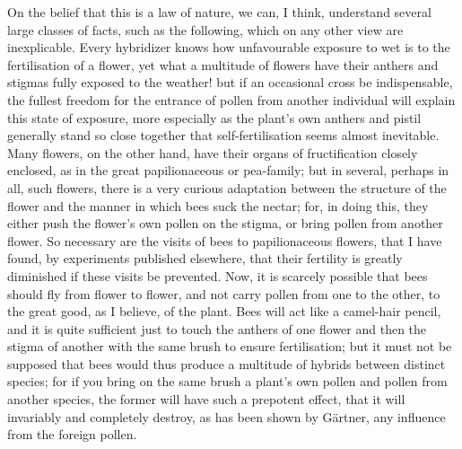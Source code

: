 \indent On the belief that this is a law of nature, we can, I think, understand several large classes of facts, such as the following, which on any other view are inexplicable.  Every hybridizer knows how unfavourable exposure to wet is to the fertilisation of a flower, yet what a multitude of flowers have their anthers and stigmas fully exposed to the weather! but if an occasional cross be indispensable, the fullest freedom for the entrance of pollen from another individual will explain this state of exposure, more especially as the plant's own anthers and pistil generally stand so close together that self-fertilisation seems almost inevitable. Many flowers, on the other hand, have their organs of fructification closely enclosed, as in the great papilionaceous or pea-family; but in several, perhaps in all, such flowers, there is a very curious adaptation between the structure of the flower and the manner in which bees suck the nectar; for, in doing this, they either push the flower's own pollen on the stigma, or bring pollen from another flower. So necessary are the visits of bees to papilionaceous flowers, that I have found, by experiments published elsewhere, that their fertility is greatly diminished if these visits be prevented. Now, it is scarcely possible that bees should fly from flower to flower, and not carry pollen from one to the other, to the great good, as I believe, of the plant. Bees will act like a camel-hair pencil, and it is quite sufficient just to touch the anthers of one flower and then the stigma of another with the same brush to ensure fertilisation; but it must not be supposed that bees would thus produce a multitude of hybrids between distinct species; for if you bring on the same brush a plant's own pollen and pollen from another species, the former will have such a prepotent effect, that it will invariably and completely destroy, as has been shown by G\"{a}rtner, any influence from the foreign pollen. \\
